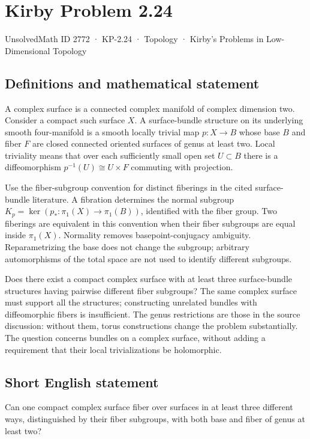 \documentclass[11pt,a4paper]{article}
\begin{document}
\section*{Kirby Problem 2.24}\label{2772}
{\small UnsolvedMath ID 2772 · KP-2.24 · Topology · Kirby's Problems in Low-Dimensional Topology}
\subsection{Definitions and mathematical statement}
A complex surface is a connected complex manifold of complex dimension two.
Consider a compact such surface $X$. A surface-bundle structure on its underlying
smooth four-manifold is a smooth locally trivial map $p:X\to B$ whose base $B$
and fiber $F$ are closed connected oriented surfaces of genus at least two.
Local triviality means that over each sufficiently small open set $U\subset B$
there is a diffeomorphism $p^{-1}(U)\cong U\times F$ commuting with projection.

Use the fiber-subgroup convention for distinct fiberings in the cited
surface-bundle literature. A fibration determines the normal subgroup
$K_p=\ker(p_*:\pi_1(X)\to\pi_1(B))$, identified with the fiber group.
Two fiberings are equivalent in this convention when their fiber subgroups
are equal inside $\pi_1(X)$. Normality removes basepoint-conjugacy ambiguity.
Reparametrizing the base does not change the subgroup; arbitrary
automorphisms of the total space are not used to identify different subgroups.

Does there exist a compact complex surface with at least three surface-bundle
structures having pairwise different fiber subgroups? The same complex surface
must support all the structures; constructing unrelated bundles with diffeomorphic
fibers is insufficient. The genus restrictions are those in the source discussion:
without them, torus constructions change the problem substantially. The question
concerns bundles on a complex surface, without adding a requirement that their
local trivializations be holomorphic.
\subsection{Short English statement}
Can one compact complex surface fiber over surfaces in at least three different ways, distinguished by their fiber subgroups, with both base and fiber of genus at least two?
\end{document}
